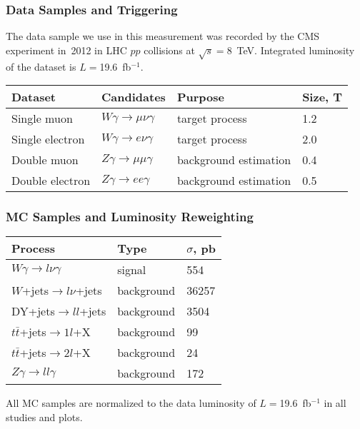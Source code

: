 \begin{frame}\frametitle{Data Samples and Triggering}
\scriptsize
The data sample we use in this measurement was recorded by the CMS experiment in~2012 in LHC $pp$ collisions at $\sqrt{s}=$8~TeV. Integrated luminosity of the dataset is $L=$19.6~fb$^{-1}$. 

\begin{table}[h]
  \scriptsize
  \begin{center}
    \begin{tabular}{|l|l|l|l|}
      \hline
      Dataset          & Candidates                        &  Purpose   & Size, T   \\ \hline
      Single muon      & $W\gamma\rightarrow\mu\nu\gamma$  &  target process   & 1.2 \\ \hline %
      Single electron  & $W\gamma\rightarrow e\nu\gamma$   &  target process   & 2.0 \\ \hline %
      Double muon      & $Z\gamma\rightarrow\mu\mu\gamma$  &  background estimation   & 0.4 \\ \hline %
      Double electron  & $Z\gamma\rightarrow ee\gamma$     &  background estimation   & 0.5 \\ \hline %
    \end{tabular}
  \end{center}
\end{table} 
\end{frame}%


\begin{frame}\frametitle{MC Samples and Luminosity Reweighting}
\begin{table}[h]
  \scriptsize
  \begin{center}
    \begin{tabular}{|l|l|l|}
      \hline
      Process                              & Type & $\sigma$, pb  \\ \hline
      $W\gamma \rightarrow l\nu\gamma$     & signal & 554   \\ \hline %
      $W$+jets$ \rightarrow l\nu $+jets   & background & 36257  \\ \hline %
      DY+jets$ \rightarrow ll $+jets     & background & 3504  \\ \hline %
      $t\bar{t}$+jets$\rightarrow 1l$+X    & background & 99    \\ \hline %
      $t\bar{t}$+jets$\rightarrow 2l$+X    & background & 24    \\ \hline
      $Z\gamma \rightarrow ll\gamma$       & background & 172   \\ \hline
    \end{tabular}
    \label{tab:mc_bkg_samples}
  \end{center}
\end{table} 

\scriptsize
All MC samples are normalized to the data luminosity of $L=$19.6~fb$^{-1}$ in all studies and plots.

\end{frame}%
